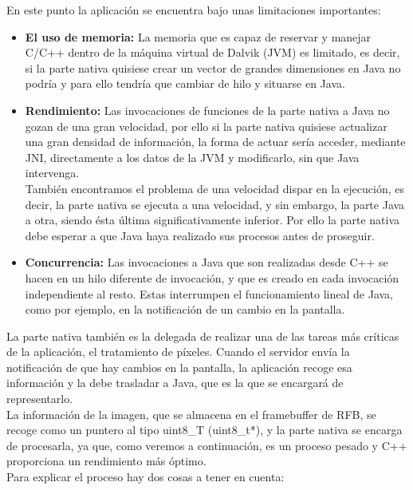 En este punto la aplicación se encuentra bajo unas limitaciones importantes:
\begin{itemize}
\item \textbf{El uso de memoria:} La memoria que es capaz de reservar y manejar C/C++ dentro de la máquina virtual de Dalvik (JVM) es limitado, es decir, si la parte nativa quisiese crear un vector de grandes dimensiones en Java no podría y para ello tendría que cambiar de hilo y situarse en Java.
\item \textbf{Rendimiento:} Las invocaciones de funciones de la parte nativa a Java no gozan de una gran velocidad, por ello si la parte nativa quisiese actualizar una gran densidad de información, la forma de actuar sería acceder, mediante JNI, directamente a los datos de la JVM y modificarlo, sin que Java intervenga.\\

También encontramos el problema de una velocidad dispar en la ejecución, es decir, la parte nativa se ejecuta a una velocidad, y sin embargo, la parte Java a otra, siendo ésta última significativamente inferior. Por ello la parte nativa debe esperar a que Java haya realizado sus procesos antes de proseguir.

\item \textbf{Concurrencia:} Las invocaciones a Java que son realizadas desde C++ se hacen en un hilo diferente de invocación, y que es creado en cada invocación independiente al resto. Estas interrumpen el funcionamiento lineal de Java, como por ejemplo, en la notificación de un cambio en la pantalla.

\end{itemize}

La parte nativa también es la delegada de realizar una de las tareas más críticas de la aplicación, el tratamiento de píxeles. Cuando el servidor envía la notificación de que hay cambios en la pantalla, la aplicación recoge esa información y la debe trasladar a Java, que es la que se encargará de representarlo.\\

La información de la imagen, que se almacena en el framebuffer de RFB, se recoge como un puntero al tipo uint8\_T (uint8\_t*), y la parte nativa se encarga de procesarla, ya que, como veremos a continuación, es un proceso pesado y C++ proporciona un rendimiento más óptimo.\\
Para explicar el proceso hay dos cosas a tener en cuenta:\\

